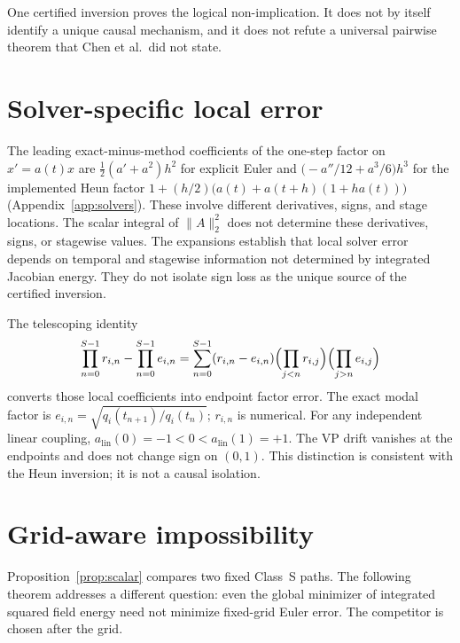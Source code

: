 \documentclass[11pt,a4paper]{article}
\theoremstyle{remark}
\begin{document}
One certified inversion proves the logical non-implication. It does not
by itself identify a unique causal mechanism, and it does not refute a
universal pairwise theorem that Chen et al.\ did not state.

\section{Solver-specific local error}
\label{sec:local}

The leading exact-minus-method coefficients of the one-step factor on
$x'=a(t)x$ are $\tfrac12(a'+a^2)h^2$ for explicit Euler and
$\bigl(-a''/12+a^3/6\bigr)h^3$ for the implemented Heun factor
$1+(h/2)\bigl(a(t)+a(t+h)(1+ha(t))\bigr)$ (Appendix~\ref{app:solvers}).
These involve different derivatives, signs, and stage locations.
The scalar integral of $\|A\|_2^2$ does not determine these derivatives,
signs, or stagewise values. The expansions establish that
local solver error depends on temporal and stagewise information not
determined by integrated Jacobian energy. They do not isolate sign loss
as the unique source of the certified inversion.

The telescoping identity
\begin{equation}
  \prod_{n=0}^{S-1} r_{i,n}-\prod_{n=0}^{S-1} e_{i,n}
  =\sum_{n=0}^{S-1}(r_{i,n}-e_{i,n})
  \Bigl(\prod_{j<n}r_{i,j}\Bigr)
  \Bigl(\prod_{j>n}e_{i,j}\Bigr)
  \label{eq:telescope}
\end{equation}
converts those local coefficients into endpoint factor error.
The exact modal factor is
$e_{i,n}=\sqrt{q_i(t_{n+1})/q_i(t_n)}$; $r_{i,n}$ is numerical.
For any independent linear coupling,
$a_{\mathrm{lin}}(0)=-1<0<a_{\mathrm{lin}}(1)=+1$. The VP drift vanishes
at the endpoints and does not change sign on $(0,1)$. This distinction
is consistent with the Heun inversion; it is not a causal isolation.

\section{Grid-aware impossibility}
\label{sec:gridaware}

Proposition~\ref{prop:scalar} compares two fixed Class~S paths. The
following theorem addresses a different question: even the global
minimizer of integrated squared field energy need not minimize
fixed-grid Euler error. The competitor is chosen after the grid.
\end{document}
